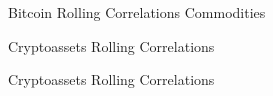 \documentclass[aspectratio=169]{beamer}
\begin{document}
\begin{frame}{Bitcoin Rolling Correlations}
    Commodities
	\begin{figure}
		\centering
		\noindent{}
	\end{figure}
\end{frame}
\begin{frame}{Cryptoassets Rolling Correlations}
	\begin{figure}
		\centering
		\noindent{}
	\end{figure}
\end{frame}
\begin{frame}{Cryptoassets Rolling Correlations}
	\begin{figure}
		\centering
		\noindent{}
	\end{figure}
\end{frame}
\end{document}
